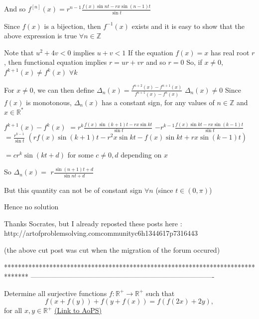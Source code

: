 \begin{solution}
\begin{tcolorbox}
And so $f^{[n]}(x)=r^{n-1}\frac{f(x)\sin nt-rx\sin(n-1)t}{\sin t}$

Since $f(x)$ is a bijection, then $f^{-1}(x)$ exists and it is easy to show that the above expression is true $\forall n\in\mathbb Z$

Note that $u^2+4v<0$ implies $u+v<1$
If the equation $f(x)=x$ has real root $r$, then functional equation implies $r=ur+vr$ and so $r=0$
So, if $x\ne 0$, $f^{k+1}(x)\ne f^k(x)$ $\forall k$

For $x\ne 0$, we can then define $\Delta_n(x)=\frac{f^{n+2}(x)-f^{n+1}(x)}{f^{n+1}(x)-f^{n}(x)}$
$\Delta_n(x)\ne 0$
Since $f(x)$ is monotonous, $\Delta_n(x)$ has a constant sign, for any values of $n\in\mathbb Z$ and $x\in\mathbb R^*$

$f^{k+1}(x)-f^{k}(x)$ $=r^{k}\frac{f(x)\sin (k+1)t-rx\sin kt}{\sin t}$ $-r^{k-1}\frac{f(x)\sin kt-rx\sin(k-1)t}{\sin t}$
$=\frac{r^{k-1}}{\sin t}$ $(rf(x)\sin (k+1)t-r^2x\sin kt-f(x)\sin kt+rx\sin(k-1)t)$

$=cr^k\sin(kt+d)$ for some $c\ne 0,d$ depending on $x$

So $\Delta_n(x)=$ $r\frac{\sin (n+1)t+d}{\sin nt+d}$

But this quantity can not be of constant sign $\forall n$ (since $t\in(0,\pi)$)

Hence no solution\end{tcolorbox}


\end{solution}



\begin{solution}
	Thanks Socrates, but I already reposted these posts here :
http://artofproblemsolving.com\/community\/c6h1344617p7316443

(the above cut post was cut when the migration of the forum occured)
\end{solution}
*******************************************************************************
-------------------------------------------------------------------------------

\begin{problem}
	Determine all surjective functions $f : \mathbb{R}^+ \to \mathbb{R}^+$ such that \[f(x+f(y))+f(y+f(x))=f(f(2x)+2y) ,\]
       for all $x,y \in \mathbb{R}^+$
	\flushright \href{https://artofproblemsolving.com/community/c6h557118}{(Link to AoPS)}
\end{problem}



